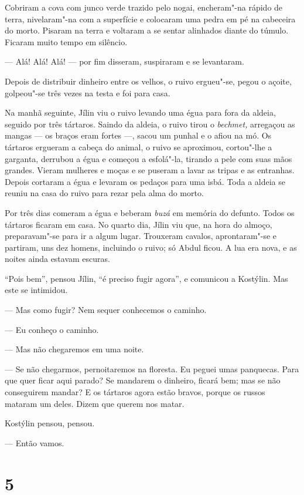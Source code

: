 Cobriram a cova com junco verde trazido pelo nogai, encheram"-na rápido
de terra, nivelaram"-na com a superfície e colocaram uma pedra em pé na
cabeceira do morto. Pisaram na terra e voltaram a se sentar alinhados
diante do túmulo. Ficaram muito tempo em silêncio.

--- Alá! Alá! Alá! --- por fim disseram, suspiraram e se levantaram.

Depois de distribuir dinheiro entre os velhos, o ruivo ergueu"-se, pegou
o açoite, golpeou"-se três vezes na testa e foi para casa.

Na manhã seguinte, Jílin viu o ruivo levando uma égua para fora da
aldeia, seguido por três tártaros. Saindo da aldeia, o ruivo tirou o
\emph{bechmet,} arregaçou as mangas --- os braços eram fortes ---, sacou
um punhal e o afiou na mó. Os tártaros ergueram a cabeça do animal, o
ruivo se aproximou, cortou"-lhe a garganta, derrubou a égua e começou a
esfolá"-la, tirando a pele com suas mãos grandes. Vieram mulheres e moças
e se puseram a lavar as tripas e as entranhas. Depois cortaram a égua e
levaram os pedaços para uma isbá. Toda a aldeia se reuniu na casa do
ruivo para rezar pela alma do morto.

Por três dias comeram a égua e beberam \emph{buzá} em memória do
defunto. Todos os tártaros ficaram em casa. No quarto dia, Jílin viu
que, na hora do almoço, preparavam"-se para ir a algum lugar. Trouxeram
cavalos, aprontaram"-se e partiram, uns dez homens, incluindo o ruivo; só
Abdul ficou. A lua era nova, e as noites ainda estavam escuras.

``Pois bem'', pensou Jílin, ``é preciso fugir agora'', e comunicou a
Kostýlin. Mas este se intimidou.

--- Mas como fugir? Nem sequer conhecemos o caminho.

--- Eu conheço o caminho.

--- Mas não chegaremos em uma noite.

--- Se não chegarmos, pernoitaremos na floresta. Eu peguei umas
panquecas. Para que quer ficar aqui parado? Se mandarem o dinheiro,
ficará bem; mas se não conseguirem mandar? E os tártaros agora estão
bravos, porque os russos mataram um deles. Dizem que querem nos matar.

Kostýlin pensou, pensou.

--- Então vamos.

\section{5}

